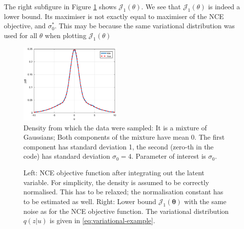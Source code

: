 \documentclass[11pt, oneside]{article}
\newcommand{\thetab}{{\boldsymbol{\theta}}}
\newcommand{\J}{\mathcal{J}}
\begin{document}
The right subfigure in Figure \ref{fig:density} shows
$\J_1(\theta)$. We see that $\J_1(\theta)$ is indeed a lower
bound. Its maximiser is not exactly equal to maximiser of the NCE
objective, and $\sigma^\ast_0$. This may be because the same
variational distribution was used for all $\theta$ when plotting $\J_1(\theta)$


\begin{figure}
  \centering
  \includegraphics[width = 0.45\textwidth]{density}
  \caption{\label{fig:density} Density from which the data were sampled: It is a mixture of Gaussians; Both components of the mixture have mean 0. The first component has standard deviation 1, the second (zero-th in the code) has standard deviation $\sigma_0 = 4$. Parameter of interest is $\sigma_0$.}
\end{figure}

\begin{figure}
  \centering
  \hfill
  \caption{\label{fig:objective} Left: NCE objective function after integrating out the latent variable. For simplicity, the density is assumed to be correctly normalised. This has to be relaxed; the normalisation constant has to be estimated as well. Right: Lower bound $\J_1(\thetab)$ with the same noise as for the NCE objective function. The variational distribution $q(z| u)$ is given in \eqref{eq:variational-example}.}
\end{figure}
  
\end{document}
